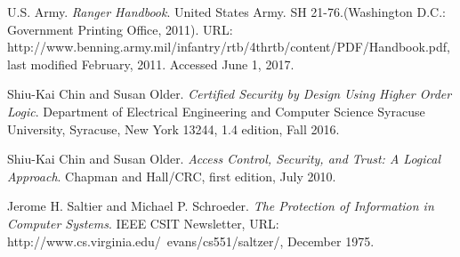 \begin{thebibliography}{9}
  U.S. Army.
  \textit{Ranger Handbook}.
  United States Army. SH 21-76.(Washington D.C.: Government Printing Office, 2011).
  URL: http://www.benning.army.mil/infantry/rtb/4thrtb/content/PDF/Handbook.pdf,
  last modified February, 2011. Accessed June 1, 2017.
  
  Shiu-Kai Chin and Susan Older.
  \textit{Certified Security by Design Using Higher Order Logic}.
  Department of Electrical Engineering and Computer Science Syracuse University, Syracuse, New York 13244, 1.4 edition, Fall 2016.

  Shiu-Kai Chin and Susan Older.
  \textit{Access Control, Security, and Trust: A Logical Approach}.
  Chapman and Hall/CRC, first edition, July 2010.

  Jerome H. Saltier and Michael P. Schroeder.
  \textit{The Protection of Information in Computer Systems}.
  IEEE CSIT Newsletter,
  URL: http://www.cs.virginia.edu/~evans/cs551/saltzer/,
  December 1975.
\end{thebibliography}


